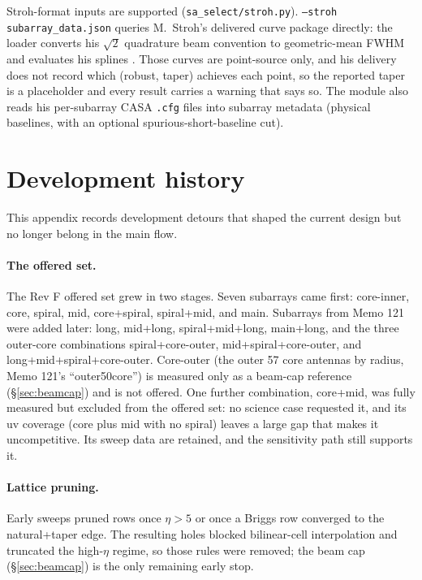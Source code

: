 \documentclass[11pt]{article}
\begin{document}
Stroh-format inputs are supported (\texttt{sa\_select/stroh.py}).
\texttt{--stroh subarray\_data.json} queries M.~Stroh's delivered curve
package directly: the loader converts his $\sqrt{2}$ quadrature beam
convention to geometric-mean FWHM and evaluates his splines
\cite{stroh}.  Those curves are point-source only, and his delivery does
not record which (robust, taper) achieves each point, so the reported
taper is a placeholder and every result carries a warning that says so.
The module also reads his per-subarray CASA \texttt{.cfg} files into
subarray metadata (physical baselines, with an optional
spurious-short-baseline cut).

\section{Development history}
\label{sec:history}

This appendix records development detours that shaped the current design
but no longer belong in the main flow.

\paragraph{The offered set.}  The Rev F offered set grew in two stages.  Seven
subarrays came first: core-inner, core, spiral, mid, core+spiral,
spiral+mid, and main.  Subarrays from Memo 121 were added later: long,
mid+long, spiral+mid+long, main+long, and the three outer-core
combinations spiral+core-outer, mid+spiral+core-outer, and
long+mid+spiral+core-outer.  Core-outer (the outer 57 core antennas by
radius, Memo 121's ``outer50core'') is measured only as a beam-cap
reference (\S\ref{sec:beamcap}) and is not offered.  One further
combination, core+mid, was fully measured but excluded from the offered
set: no science case requested it, and its uv coverage (core plus mid with
no spiral) leaves a large gap that makes it uncompetitive.  Its sweep data
are retained, and the sensitivity path still supports it.

\paragraph{Lattice pruning.}  Early sweeps pruned rows once $\eta>5$ or once a
Briggs row converged to the natural+taper edge.  The resulting holes
blocked bilinear-cell interpolation and truncated the high-$\eta$ regime,
so those rules were removed; the beam cap (\S\ref{sec:beamcap}) is the
only remaining early stop.
\end{document}
